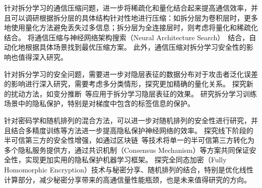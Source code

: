 针对拆分学习的通信压缩问题，进一步将稀疏化和量化结合起来提高通信效率，并且可以调研根据拆分层的具体结构针对性地进行压缩：如拆分层为卷积层时，更多地使用量化方法避免丢失过多信息；拆分层为全连接层时，则考虑将量化和稀疏化结合。
将通信压缩与神经网络架构搜索（Neural Architecture Search）~\cite{renpengzhen_2021_nas_survey}结合，自动化地根据具体场景找到最优压缩方案。
此外，通信压缩对拆分学习安全性的影响也值得深入研究。

针对拆分学习的安全问题，需要进一步对隐层表征的数据分布对于攻击者泛化误差的影响进行深入研究，需要考虑多分类情形，探究更加精确的量化关系。
探究新的扰动方法，如变分推断~\cite{kingma_2014_vae,alemi_2022_deep_variational}等应用于拆分学习隐层表征的效果。
研究拆分学习训练场景中的隐私保护，特别是对梯度中包含的标签信息的保护。

针对密码学和随机排列的混合方法，可以进一步对随机排列的安全性进行研究，并且结合多精度训练等方法进一步提高隐私保护神经网络的效率。
%
探究线下阶段的半可信第三方的安全性增强，如通过区块链~\cite{belotti_2019_blockchain}等技术将单一的半可信第三方转化为多个隐私服务提供方，通过共识机制（Consensus Mechanism）等方案共同保证安全性，实现更加实用的隐私保护机器学习框架。
%
探究全同态加密（Fully Homomorphic Encryption）技术与秘密分享、随机排列的结合，特别是优化线性计算部分，减少秘密分享带来的高通信量性能瓶颈，也是未来值得研究的方向。